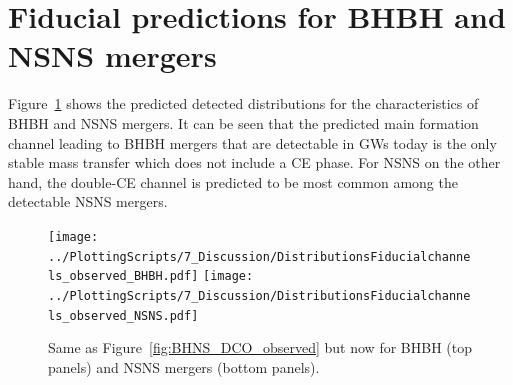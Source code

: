\documentclass[twocolumn]{aastex63}
\newcommand\bhnsSingle{BHNS\xspace}
\begin{document}
%






%
%

\section{Fiducial predictions for \ac{BHBH} and \ac{NSNS} mergers}
\label{sec:app-fiducial-GW-predictions-for-BBH-BNS}

Figure~\ref{fig:BHNS_DCO_observed_BNS} shows the predicted detected distributions for the characteristics of BHBH and NSNS mergers.  It can be seen that the predicted main formation channel leading to BHBH mergers that are detectable in \acp{GW} today  is the only stable mass transfer which does not include a \ac{CE} phase. For NSNS on the other hand, the double-CE channel is predicted to be most common among the detectable NSNS mergers. 



\begin{figure}
   \texttt{[image: ../PlottingScripts/7\_Discussion/DistributionsFiducialchannels\_observed\_BHBH.pdf]}
\texttt{[image: ../PlottingScripts/7\_Discussion/DistributionsFiducialchannels\_observed\_NSNS.pdf]}
      \caption{ Same as Figure~\ref{fig:BHNS_DCO_observed} but now for \ac{BHBH} (top panels) and \ac{NSNS} mergers (bottom panels). }
  \label{fig:BHNS_DCO_observed_BNS}
\end{figure}
%
\end{document}
